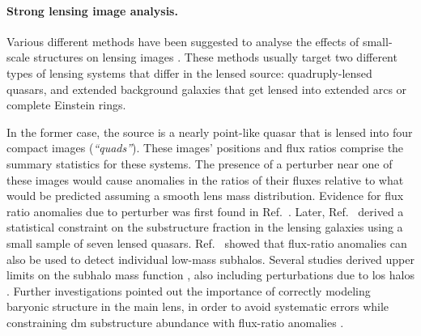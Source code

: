 \paragraph*{Strong lensing image analysis.} Various different methods have been suggested to analyse the effects of small-scale structures on lensing images \cite{Drlica-Wagner:2019aa}. These methods usually target two different types of lensing systems that differ in the lensed source: quadruply-lensed quasars, and extended background galaxies that get lensed into extended arcs or complete Einstein rings.

In the former case, the source is a nearly point-like quasar that is lensed into four compact images  (\emph{``quads''}). These images' positions and flux ratios comprise the summary statistics for these systems. The presence of a perturber near one of these images would cause anomalies in the ratios of their fluxes relative to what would be predicted assuming a smooth lens mass distribution. Evidence for flux ratio anomalies due to perturber was first found in Ref.~\cite{Mao:1997ek}. Later, Ref.~\cite{Dalal:2001fq} derived a statistical constraint on the substructure fraction in the lensing galaxies using a small sample of seven lensed quasars. Ref.~\cite{Nierenberg:2014cga} showed that flux-ratio anomalies can also be used to detect individual low-mass subhalos. Several studies derived upper limits on the subhalo mass function %
\cite{Nierenberg:2017vlg}, also including perturbations due to \gls*{los} halos \cite{Gilman:2017voy, Gilman:2019nap}. Further investigations pointed out the importance of correctly modeling baryonic structure in the main lens, in order to avoid systematic errors while constraining \gls*{dm} substructure abundance with flux-ratio anomalies \cite{Hsueh:2016aih, Hsueh:2017zfs, Hsueh:2019ynk}. 


